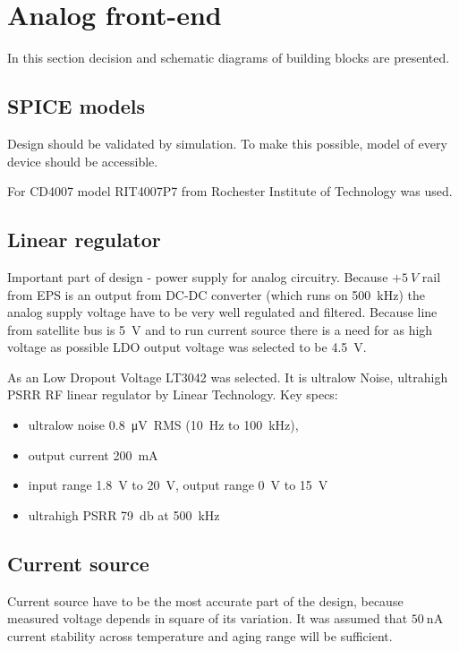 \section{Analog front-end}
    In this section decision and schematic diagrams of building blocks are presented.

    \subsection{SPICE models}
        Design should be validated by simulation. To make this possible, model of every device should be accessible.

        For CD4007 model RIT4007P7 from Rochester Institute of Technology \cite{RIT_FULLER} was used.

    \subsection{Linear regulator}
        Important part of design - power supply for analog circuitry. Because $+\SI{5}{V}$ rail from EPS is an output from DC-DC converter (which runs on \SI{500}{\kilo\hertz}) the analog supply voltage have to be very well regulated and filtered. Because line from satellite bus is \SI{5}{\volt} and to run current source there is a need for as high voltage as possible LDO output voltage was selected to be \SI{4.5}{\volt}.

        As an Low Dropout Voltage LT3042 was selected. It is ultralow Noise, ultrahigh PSRR RF linear regulator by Linear Technology. Key specs:
        \begin{itemize}
            \item ultralow noise \SI{0.8}{\micro\volt RMS} (\SI{10}{\hertz} to \SI{100}{\kilo\hertz}),
            \item output current \SI{200}{\milli\ampere}
            \item input range \SI{1.8}{\volt} to \SI{20}{\volt}, output range \SI{0}{\volt} to \SI{15}{\volt}
            \item ultrahigh PSRR \SI{79}{\decibel} at \SI{500}{\kilo\hertz}
        \end{itemize}

    \subsection{Current source}
        Current source have to be the most accurate part of the design, because measured voltage depends in square of its variation. It was assumed that $\SI{50}{\nano\ampere}$ current stability across temperature and aging range will be sufficient.

